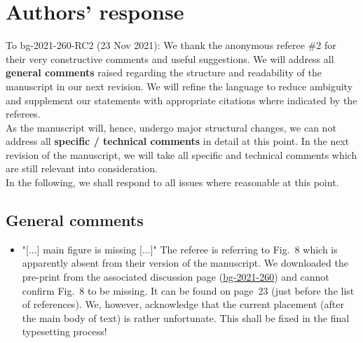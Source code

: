 \documentclass{scrartcl}
\begin{document}
\section*{Authors' response}
To bg-2021-260-RC2 (23 Nov 2021):
We thank the anonymous referee \#2 for their very constructive comments and useful suggestions.
We will address all \textbf{general comments} raised regarding the structure and readability of the manuscript in our next revision. We will refine the language to reduce ambiguity and supplement our statements with appropriate citations where indicated by the referees.\\
As the manuscript will, hence, undergo major structural changes, we can not address all \textbf{specific / technical comments} in detail at this point. In the next revision of the manuscript, we will take all specific and technical comments which are still relevant into consideration.\\
In the following, we shall respond to all issues where reasonable at this point.

\subsection*{General comments}
\begin{itemize}
    
    \item {\color{blue} "[...] main figure is missing [...]"} The referee is referring to Fig.~8 which is apparently absent from their version of the manuscript. We downloaded the pre-print from the associated discussion page (\href{https://bg.copernicus.org/preprints/bg-2021-260/}{bg-2021-260}) and cannot confirm Fig.~8 to be missing. It can be found on page~23 (just before the list of references). We, however, acknowledge that the current placement (after the main body of text) is rather unfortunate. This shall be fixed in the final typesetting process!

\end{itemize}
\end{document}
